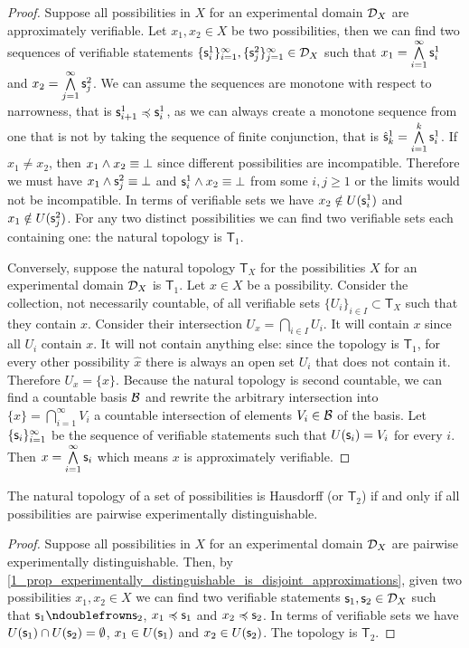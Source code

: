 \documentclass[11pt,letterpaper,fleqn]{memoir} %
\begin{document}
\begin{mathSection}
\begin{proof}
	Suppose all possibilities in $X$ for an experimental domain $\mathcal{D}_X$ are approximately verifiable. Let $x_1, x_2 \in X$ be two possibilities, then we can find two sequences of verifiable statements $\{\mathsf{s}_i^1\}_{i=1}^\infty, \{\mathsf{s}_j^2\}_{j=1}^\infty \in \mathcal{D}_X$ such that $x_1=\bigwedge\limits_{i=1}^\infty \mathsf{s}_i^1$ and $x_2=\bigwedge\limits_{j=1}^\infty \mathsf{s}_j^2$. We can assume the sequences are monotone with respect to narrowness, that is $\mathsf{s}_{i+1}^1 \preccurlyeq \mathsf{s}_i^1$, as we can always create a monotone sequence from one that is not by taking the sequence of finite conjunction, that is $\hat{\mathsf{s}}_k^1=\bigwedge\limits_{i=1}^k \mathsf{s}_i^1$. If $x_1 \neq x_2$, then $x_1 \wedge x_2 \equiv \bot$ since different possibilities are incompatible. Therefore we must have $x_1 \wedge \mathsf{s}_j^2 \equiv \bot$ and $\mathsf{s}_i^1 \wedge x_2 \equiv \bot$ from some $i,j \geq 1$ or the limits would not be incompatible. In terms of verifiable sets we have $x_2 \notin U(\mathsf{s}_i^1)$ and $x_1 \notin U(\mathsf{s}_j^2)$. For any two distinct possibilities we can find two verifiable sets each containing one: the natural topology is $\mathsf{T}_1$.

	Conversely, suppose the natural topology $\mathsf{T}_X$ for the possibilities $X$ for an experimental domain $\mathcal{D}_X$ is $\mathsf{T}_1$. Let $x \in X$ be a possibility. Consider the collection, not necessarily countable, of all verifiable sets $\{U_i\}_{i \in I} \subset \mathsf{T}_X$ such that they contain $x$. Consider their intersection $U_x = \bigcap\limits_{i \in I} U_i$. It will contain $x$ since all $U_i$ contain $x$. It will not contain anything else: since the topology is $\mathsf{T}_1$, for every other possibility $\hat{x}$ there is always an open set $U_i$ that does not contain it. Therefore $U_x = \{x\}$. Because the natural topology is second countable, we can find a countable basis $\mathcal{B}$ and rewrite the arbitrary intersection into $\{x\} = \bigcap\limits_{i=1}^\infty V_i$ a countable intersection of elements $V_i \in \mathcal{B}$ of the basis. Let $\{\mathsf{s}_i\}_{i=1}^\infty$ be the sequence of verifiable statements such that $U(\mathsf{s}_i) = V_i$ for every $i$. Then $x=\bigwedge\limits_{i=1}^\infty \mathsf{s}_i$ which means $x$ is approximately verifiable.

\end{proof}
\begin{prop}
	The natural topology of a set of possibilities is Hausdorff (or $\mathsf{T}_2$) if and only if all possibilities are pairwise experimentally distinguishable.
\end{prop}
\begin{proof}
	Suppose all possibilities in $X$ for an experimental domain $\mathcal{D}_X$ are pairwise experimentally distinguishable. Then, by \ref{1_prop_experimentally_distinguishable_is_disjoint_approximations}, given two possibilities $x_1, x_2 \in X$ we can find two verifiable statements $\mathsf{s}_1, \mathsf{s}_2 \in \mathcal{D}_X$ such that $\stmt_1 \ncomp \stmt_2$, $x_1 \preccurlyeq \mathsf{s}_1$ and $x_2 \preccurlyeq \mathsf{s}_2$. In terms of verifiable sets we have $U(\mathsf{s}_1) \cap U(\mathsf{s}_2) = \emptyset$, $x_1 \in U(\mathsf{s}_1)$ and $x_2 \in U(\mathsf{s}_2)$. The topology is $\mathsf{T}_2$.
	

\end{proof}
\end{mathSection}
\end{document}
